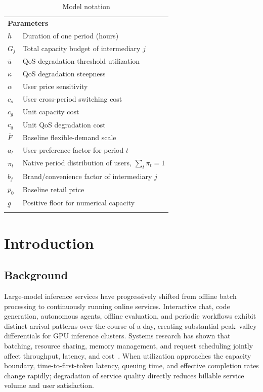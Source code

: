 \documentclass[11pt,a4paper]{article}
\begin{document}
\begin{longtable}{@{}p{}p{}@{}}
\midrule
\multicolumn{2}{l}{\textbf{Parameters}} \\
$h$ & Duration of one period (hours) \\
$G_j$ & Total capacity budget of intermediary $j$ \\
$\bar u$ & QoS degradation threshold utilization \\
$\kappa$ & QoS degradation steepness \\
$\alpha$ & User price sensitivity \\
$c_s$ & User cross-period switching cost \\
$c_g$ & Unit capacity cost \\
$c_q$ & Unit QoS degradation cost \\
$\bar F$ & Baseline flexible-demand scale \\
$a_t$ & User preference factor for period $t$ \\
$\pi_t$ & Native period distribution of users, $\sum_t\pi_t=1$ \\
$b_j$ & Brand/convenience factor of intermediary $j$ \\
$p_0$ & Baseline retail price \\
$\underline g$ & Positive floor for numerical capacity \\
\bottomrule
\caption{Model notation}
\label{tab:nomenclature}
\end{longtable}

\section{Introduction}
\label{sec:intro}

\subsection{Background}

Large-model inference services have progressively shifted from offline batch processing to continuously running online services. Interactive chat, code generation, autonomous agents, offline evaluation, and periodic workflows exhibit distinct arrival patterns over the course of a day, creating substantial peak--valley differentials for GPU inference clusters. Systems research has shown that batching, resource sharing, memory management, and request scheduling jointly affect throughput, latency, and cost~\cite{crankshaw2017clipper,gujarati2020clockwork,romero2021infaas,yu2022orca,kwon2023pagedattention,agrawal2024sarathiserve}. When utilization approaches the capacity boundary, time-to-first-token latency, queuing time, and effective completion rates change rapidly; degradation of service quality directly reduces billable service volume and user satisfaction.
\end{document}
